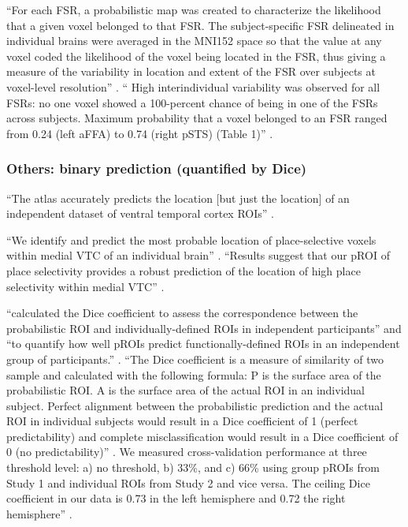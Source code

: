 %
``For each FSR, a probabilistic map was created to characterize the likelihood
that a given voxel belonged to that FSR.
%
The subject-specific FSR delineated in individual brains were averaged in the
MNI152 space so that the value at any voxel coded the likelihood of the voxel
being located in the FSR, thus giving a measure of the variability in location
and extent of the FSR over subjects at voxel-level resolution''
\citep{zhen2015quantifying}.
%
``
High interindividual variability was observed for all FSRs: no one voxel showed
a 100-percent chance of being in one of the FSRs across subjects.
%
Maximum probability that a voxel belonged to an FSR ranged from 0.24 (left aFFA)
to 0.74 (right pSTS) (Table 1)'' \citet{zhen2015quantifying}.



\subsubsection{Others: binary prediction (quantified by Dice)}

%
``The atlas accurately predicts the location [but just the location] of an
independent dataset of ventral temporal cortex ROIs''
\citep{rosenke2021probabilistic}.

%
``We identify and predict the most probable location of place-selective voxels
within medial VTC of an individual brain'' \citep{weiner2018defining}.
%
``Results suggest that our pROI of place selectivity provides a robust
prediction of the location of high place selectivity within medial VTC''
\citep{weiner2018defining}.


%
\citet{weiner2018defining} ``calculated the Dice coefficient to assess the
correspondence between the probabilistic ROI and individually-defined ROIs in
independent participants'' and ``to quantify how well pROIs predict
functionally-defined ROIs in an independent group of participants.''
\citep{weiner2018defining}.
%
``The Dice coefficient is a measure of similarity of two sample and calculated
with the following formula:
%
P is the surface area of the probabilistic ROI.
%
A is the surface area of the actual ROI in an individual subject.
%
Perfect alignment between the probabilistic prediction and the actual ROI in
individual subjects would result in a Dice coefficient of 1 (perfect
predictability) and complete misclassification would result in a Dice
coefficient of 0 (no predictability)'' \citep{weiner2018defining}.
%
We measured cross-validation performance at three threshold level:
%
a) no threshold, b) 33\%, and c) 66\%
%
using group pROIs from Study 1 and individual ROIs from Study 2 and vice versa.
%
The ceiling Dice coefficient in our data is 0.73 in the left hemisphere and 0.72
the right hemisphere'' \citep{weiner2018defining}.

